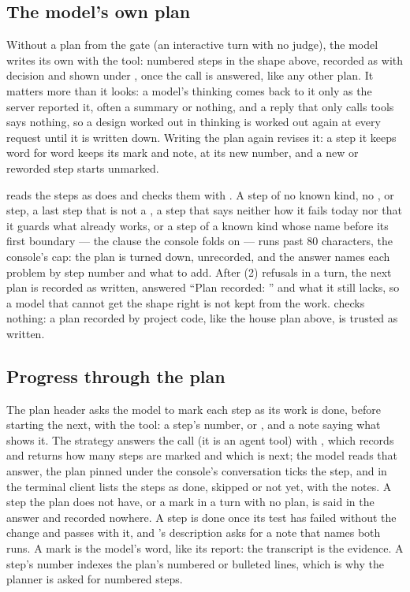\subsection{The model's own plan}

Without a plan from the gate (an interactive turn with no judge), the model
writes its own with the  tool: numbered steps in the shape
above, recorded as  with decision  and shown
under , once the call is answered, like any other plan. It matters more than it
looks: a model's thinking comes back to it only as the server reported it,
often a summary or nothing, and a reply that only calls tools says nothing,
so a design worked out in thinking is worked out again at every request
until it is written down. Writing the plan again revises it: a step it
keeps word for word keeps its mark and note, at its new number, and a new
or reworded step starts unmarked.

 reads the steps as  does and
checks them with . A step of no known kind, no
,  or  step, a last step that is
not a , a  step that says neither how it fails
today nor that it guards what already works, or a step of a known kind
whose name before its first boundary --- the clause the console folds on
--- runs past 80 characters, the console's cap: the plan is turned down,
unrecorded, and the answer names each problem by step number and what to
add. After  (2) refusals in a turn, the next plan
is recorded as written, answered ``Plan recorded: '' and what it still
lacks, so a model that cannot get the shape right is not kept from the
work.  checks nothing: a plan recorded by project code,
like the house plan above, is trusted as written.

\subsection{Progress through the plan}

The plan header asks the model to mark each step as its work is done, before
starting the next, with the  tool: a step's number,  or
, and a note saying what shows it. The strategy answers the
call (it is an agent tool) with , which records
 and returns how many steps are marked and which is next;
the model reads that answer, the plan pinned under the console's conversation ticks the step, and
 in the terminal client lists the steps as \code{[x]} done,
\code{[-]} skipped or \code{[ ]} not yet, with the notes. A step the plan
does not have, or a mark in a turn with no plan, is said in the answer and
recorded nowhere. A  step is done once its test has failed
without the change and passes with it, and 's description
asks for a note that names both runs. A mark is the model's word, like its
report: the transcript is the evidence. A step's number indexes the plan's numbered or
bulleted lines, which is why the planner is asked for numbered steps.

